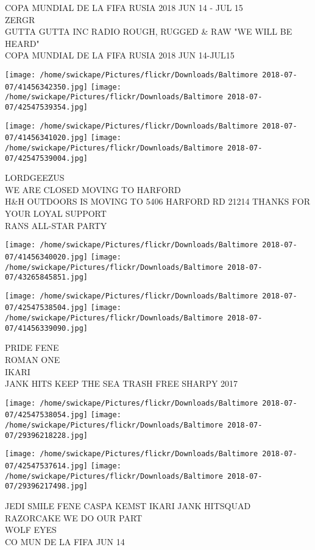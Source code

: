 \documentclass[10pt,letterpaper]{article}
\begin{document}
COPA MUNDIAL DE LA FIFA RUSIA 2018 JUN 14 {-} JUL 15\\
ZERGR\\
GUTTA GUTTA INC RADIO ROUGH, RUGGED \& RAW "WE WILL BE HEARD"\\
COPA MUNDIAL DE LA FIFA RUSIA 2018 JUN 14{-}JUL15
\pagebreak

\texttt{[image: /home/swickape/Pictures/flickr/Downloads/Baltimore 2018-07-07/41456342350.jpg]}
\texttt{[image: /home/swickape/Pictures/flickr/Downloads/Baltimore 2018-07-07/42547539354.jpg]}

\texttt{[image: /home/swickape/Pictures/flickr/Downloads/Baltimore 2018-07-07/41456341020.jpg]}
\texttt{[image: /home/swickape/Pictures/flickr/Downloads/Baltimore 2018-07-07/42547539004.jpg]}

LORDGEEZUS\\
WE ARE CLOSED MOVING TO HARFORD\\
H\&H OUTDOORS IS MOVING TO 5406 HARFORD RD 21214 THANKS FOR YOUR LOYAL SUPPORT\\
RANS ALL{-}STAR PARTY
\pagebreak

\texttt{[image: /home/swickape/Pictures/flickr/Downloads/Baltimore 2018-07-07/41456340020.jpg]}
\texttt{[image: /home/swickape/Pictures/flickr/Downloads/Baltimore 2018-07-07/43265845851.jpg]}

\texttt{[image: /home/swickape/Pictures/flickr/Downloads/Baltimore 2018-07-07/42547538504.jpg]}
\texttt{[image: /home/swickape/Pictures/flickr/Downloads/Baltimore 2018-07-07/41456339090.jpg]}

PRIDE FENE\\
ROMAN ONE\\
IKARI\\
JANK HITS KEEP THE SEA TRASH FREE SHARPY 2017
\pagebreak

\texttt{[image: /home/swickape/Pictures/flickr/Downloads/Baltimore 2018-07-07/42547538054.jpg]}
\texttt{[image: /home/swickape/Pictures/flickr/Downloads/Baltimore 2018-07-07/29396218228.jpg]}

\texttt{[image: /home/swickape/Pictures/flickr/Downloads/Baltimore 2018-07-07/42547537614.jpg]}
\texttt{[image: /home/swickape/Pictures/flickr/Downloads/Baltimore 2018-07-07/29396217498.jpg]}

JEDI SMILE FENE CASPA KEMST IKARI JANK HITSQUAD\\
RAZORCAKE WE DO OUR PART\\
WOLF EYES\\
CO MUN DE LA FIFA JUN 14
\pagebreak
\end{document}
